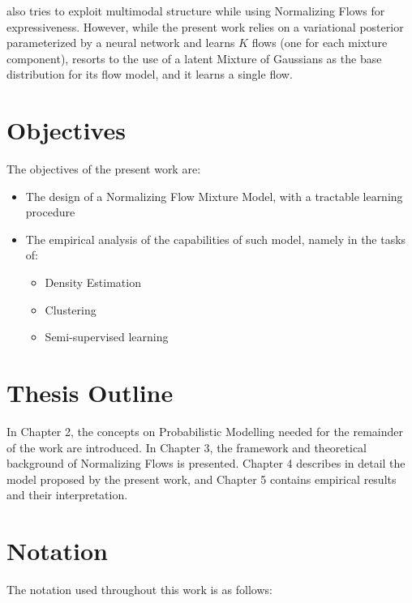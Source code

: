 \cite{semisuplearning_nflows} also tries to exploit multimodal structure while
using Normalizing Flows for expressiveness. However, while the present work relies on
a variational posterior parameterized by a neural network and learns $K$ flows
(one for each mixture component), \cite{semisuplearning_nflows} resorts to the use of a
latent Mixture of Gaussians as the base distribution for its flow model, and it
learns a single flow.

\section{Objectives}
\label{section:objectives}

The objectives of the present work are:
\begin{itemize}
    \item The design of a Normalizing Flow Mixture Model, with a tractable learning procedure
    \item The empirical analysis of the capabilities of such model, namely in the tasks of:
        \begin{itemize}
        \item Density Estimation
        \item Clustering
        \item Semi-supervised learning
        \end{itemize}
\end{itemize}

\section{Thesis Outline}
\label{section:outline}

In Chapter 2, the concepts on Probabilistic Modelling needed for the remainder
of the work are introduced. In Chapter 3, the framework and theoretical background
of Normalizing Flows is presented. Chapter 4 describes in detail the model
proposed by the present work, and Chapter 5 contains empirical results and their
interpretation.

\section{Notation}
\label{section:notation}
The notation used throughout this work is as follows:

